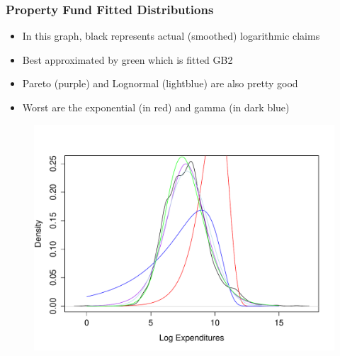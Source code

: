 \documentclass{beamer}
\begin{document}
\begin{frame}[shrink=2]
\frametitle{Property Fund Fitted Distributions}
\begin{itemize}
\item In this graph, black represents actual (smoothed) logarithmic claims
\item Best approximated by green which is fitted GB2
\item Pareto (purple) and Lognormal (lightblue) are also pretty good
\item Worst are the exponential (in red) and gamma (in dark blue)
\end{itemize}

\vspace{-.2in}
\begin{figure}[htp]
\begin{center}
    \includegraphics[width=.8\textwidth]{Figures/PropertyFundFittedSeverities.pdf}
\end{center}
\end{figure}
\end{frame}
\end{document}
